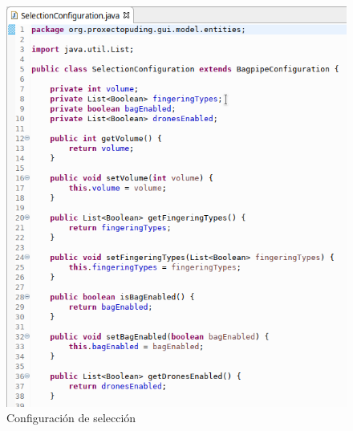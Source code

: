    \begin{figure}[htbp]
    \centering
    \includegraphics[scale=0.6, keepaspectratio=true]{./imagenes/selection-configuration.png}
    \caption{Configuración de selección}
    \label{figura:SelectionConfiguration}
   \end{figure}
   
